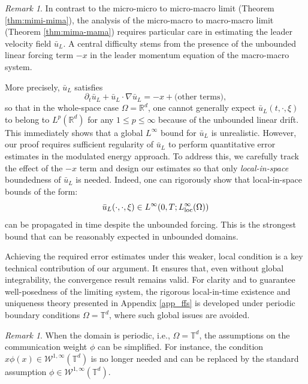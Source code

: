 \documentclass[10pt, reqno]{amsart}
\theoremstyle{definition}
\theoremstyle{remark}
\newtheorem{remark}[theorem]{Remark}
\numberwithin{equation}{section}
\newcommand{\R}{\mathbb{R}}
\newcommand{\T}{\mathbb{T}}
\begin{document}
\begin{remark}\label{rem: en}
In contrast to the micro-micro to micro-macro limit (Theorem \ref{thm:mimi-mima}), the analysis of the micro-macro to macro-macro limit (Theorem \ref{thm:mima-mama}) requires particular care in estimating the leader velocity field $\bar u_L$. A central difficulty stems from the presence of the unbounded linear forcing term $-x$ in the leader momentum equation of the macro-macro system.

More precisely, $\bar u_L$ satisfies
\[
\partial_t \bar u_L  + \bar u_L \cdot \nabla \bar u_L = - x + \text{(other terms)},
\]
so that in the whole-space case $\Omega = \R^d$, one cannot generally expect $\bar u_L(t,\cdot,\xi)$ to belong to $L^p(\R^d)$ for any $1 \leq p \leq \infty$ because of the unbounded linear drift. This immediately shows that a global $L^\infty$ bound for $\bar u_L$ is unrealistic. However, our proof requires sufficient regularity of $\bar u_L$ to perform quantitative error estimates in the modulated energy approach. To address this, we carefully track the effect of the $-x$ term and design our estimates so that only {\it local-in-space} boundedness of $\bar u_L$ is needed. Indeed, one can rigorously show that local-in-space bounds of the form:
\[
\bar u_L(\cdot,\cdot,\xi) \in L^\infty(0,T; L^\infty_{\rm loc}(\Omega))
\]
can be propagated in time despite the unbounded forcing. This is the strongest bound that can be reasonably expected in unbounded domains.

Achieving the required error estimates under this weaker, local condition is a key technical contribution of our argument. It ensures that, even without global integrability, the convergence result remains valid. For clarity and to guarantee well-posedness of the limiting system, the rigorous local-in-time existence and uniqueness theory presented in Appendix \ref{app_ffs} is developed under periodic boundary conditions $\Omega = \T^d$, where such global issues are avoided.
\end{remark}

 

\begin{remark}
When the domain is periodic, i.e., $\Omega = \T^d$, the assumptions on the communication weight $\phi$ can be simplified. For instance, the condition $x \phi(x) \in \mathcal{W}^{1,\infty}(\T^d)$ is no longer needed and can be replaced by the standard assumption $\phi \in \mathcal{W}^{1,\infty}(\T^d)$.
\end{remark}
\end{document}

